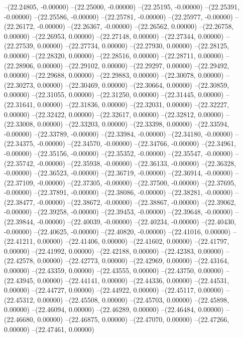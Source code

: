 --(22.24805, -0.00000)
--(22.25000, -0.00000)
--(22.25195, -0.00000)
--(22.25391, -0.00000)
--(22.25586, -0.00000)
--(22.25781, -0.00000)
--(22.25977, -0.00000)
--(22.26172, -0.00000)
--(22.26367, -0.00000)
--(22.26562, 0.00000)
--(22.26758, 0.00000)
--(22.26953, 0.00000)
--(22.27148, 0.00000)
--(22.27344, 0.00000)
--(22.27539, 0.00000)
--(22.27734, 0.00000)
--(22.27930, 0.00000)
--(22.28125, 0.00000)
--(22.28320, 0.00000)
--(22.28516, 0.00000)
--(22.28711, 0.00000)
--(22.28906, 0.00000)
--(22.29102, 0.00000)
--(22.29297, 0.00000)
--(22.29492, 0.00000)
--(22.29688, 0.00000)
--(22.29883, 0.00000)
--(22.30078, 0.00000)
--(22.30273, 0.00000)
--(22.30469, 0.00000)
--(22.30664, 0.00000)
--(22.30859, 0.00000)
--(22.31055, 0.00000)
--(22.31250, 0.00000)
--(22.31445, 0.00000)
--(22.31641, 0.00000)
--(22.31836, 0.00000)
--(22.32031, 0.00000)
--(22.32227, 0.00000)
--(22.32422, 0.00000)
--(22.32617, 0.00000)
--(22.32812, 0.00000)
--(22.33008, 0.00000)
--(22.33203, 0.00000)
--(22.33398, 0.00000)
--(22.33594, -0.00000)
--(22.33789, -0.00000)
--(22.33984, -0.00000)
--(22.34180, -0.00000)
--(22.34375, -0.00000)
--(22.34570, -0.00000)
--(22.34766, -0.00000)
--(22.34961, -0.00000)
--(22.35156, -0.00000)
--(22.35352, -0.00000)
--(22.35547, -0.00000)
--(22.35742, -0.00000)
--(22.35938, -0.00000)
--(22.36133, -0.00000)
--(22.36328, -0.00000)
--(22.36523, -0.00000)
--(22.36719, -0.00000)
--(22.36914, -0.00000)
--(22.37109, -0.00000)
--(22.37305, -0.00000)
--(22.37500, -0.00000)
--(22.37695, -0.00000)
--(22.37891, -0.00000)
--(22.38086, -0.00000)
--(22.38281, -0.00000)
--(22.38477, -0.00000)
--(22.38672, -0.00000)
--(22.38867, -0.00000)
--(22.39062, -0.00000)
--(22.39258, -0.00000)
--(22.39453, -0.00000)
--(22.39648, -0.00000)
--(22.39844, -0.00000)
--(22.40039, -0.00000)
--(22.40234, -0.00000)
--(22.40430, -0.00000)
--(22.40625, -0.00000)
--(22.40820, -0.00000)
--(22.41016, 0.00000)
--(22.41211, 0.00000)
--(22.41406, 0.00000)
--(22.41602, 0.00000)
--(22.41797, 0.00000)
--(22.41992, 0.00000)
--(22.42188, 0.00000)
--(22.42383, 0.00000)
--(22.42578, 0.00000)
--(22.42773, 0.00000)
--(22.42969, 0.00000)
--(22.43164, 0.00000)
--(22.43359, 0.00000)
--(22.43555, 0.00000)
--(22.43750, 0.00000)
--(22.43945, 0.00000)
--(22.44141, 0.00000)
--(22.44336, 0.00000)
--(22.44531, 0.00000)
--(22.44727, 0.00000)
--(22.44922, 0.00000)
--(22.45117, 0.00000)
--(22.45312, 0.00000)
--(22.45508, 0.00000)
--(22.45703, 0.00000)
--(22.45898, 0.00000)
--(22.46094, 0.00000)
--(22.46289, 0.00000)
--(22.46484, 0.00000)
--(22.46680, 0.00000)
--(22.46875, 0.00000)
--(22.47070, 0.00000)
--(22.47266, 0.00000)
--(22.47461, 0.00000)
